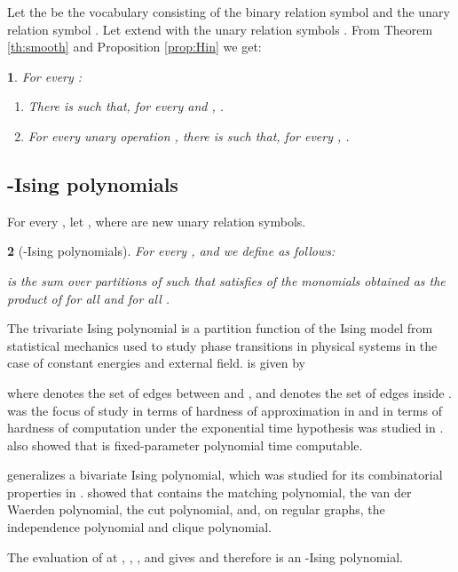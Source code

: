 \documentclass{llncs}
\newtheorem{thm}{\protect\theoremname}
\newtheorem{defn}[thm]{\protect\definitionname}
\providecommand{\definitionname}{Definition}
\providecommand{\theoremname}{Theorem}
\begin{document}
Let  the be the vocabulary consisting of the binary relation
symbol  and the unary relation symbol .
Let  extend  with the unary relation
symbols . 
From Theorem \ref{th:smooth} and Proposition \ref{prop:Hin} we get:
\begin{thm}
For every :
\begin{enumerate}
\item There is 
such that, for every  and , 
\newline
. 
\item For every unary operation ,
there is 
such that, for every , . 
\end{enumerate}
\end{thm}

\subsection{-Ising polynomials \label{se:MSOLISing}}

For every , let ,
where  are new unary relation symbols.
\begin{defn}
[-Ising polynomials] \label{def:MSOLIsing} For every ,
 and  we define 
as follows: 

 is the sum over partitions  of
 such that  satisfies 
of the monomials obtained as the product of  for
all  and 
for all . \end{defn}

 
\begin{example}
 The trivariate Ising polynomial 
is a partition function of the Ising model from statistical mechanics
used to study phase transitions in physical systems in the case of
constant energies and external field.  is given by 

where  denotes the set of edges between  and ,
and  denotes the set of edges inside .  was
the focus of study in terms of hardness of approximation in \cite{ar:GJP03}
and in terms of hardness of computation under the exponential time
hypothesis was studied in \cite{kotek2012complexity}. \cite{kotek2012complexity}
also showed that  is fixed-parameter polynomial time
computable.

 generalizes a bivariate Ising polynomial,
which was studied for its combinatorial properties in \cite{ar:AndrenMarkstrom2009}.
\cite{ar:AndrenMarkstrom2009} showed that  contains
the matching polynomial, the van der Waerden polynomial, the cut polynomial,
and, on regular graphs, the independence polynomial and clique polynomial. 

The evaluation of  
at 
, , ,  and 
gives  and therefore  is an -Ising polynomial.
\end{example}
\end{document}
